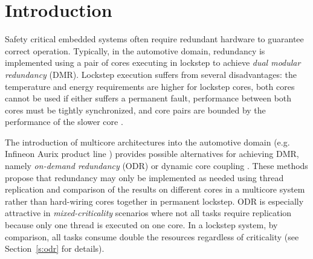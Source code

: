 
\chapter{Introduction} %

\label{c:intro} %


	Safety critical embedded systems often require redundant hardware to guarantee correct operation. 
	Typically, in the automotive domain, redundancy is implemented using a pair of cores executing in lockstep to achieve \emph{dual modular redundancy} (DMR). 
	Lockstep execution suffers from several disadvantages: the temperature and energy requirements are higher for lockstep cores, both cores cannot be used if either suffers a permanent fault, performance between both cores must be tightly synchronized, and core pairs are bounded by the performance of the slower core \cite{lafrieda2007utilizing}. 
	
	The introduction of multicore architectures into the automotive domain (e.g. Infineon Aurix product line \cite{infineon2014aurix}) provides possible alternatives for achieving DMR, namely \emph{on-demand redundancy} (ODR) \cite{Meyer:CASES11,fu2013demand} or dynamic core coupling \cite{lafrieda2007utilizing}. 
	These methods propose that redundancy may only be implemented as needed using thread replication and comparison of the results on different cores in a multicore system rather than hard-wiring cores together in permanent lockstep. 
	ODR is especially attractive in \emph{mixed-criticality} scenarios where not all tasks require replication because only one thread is executed on one core.
	In a lockstep system, by comparison, all tasks consume double the resources regardless of criticality (see Section~\ref{s:odr} for details).

